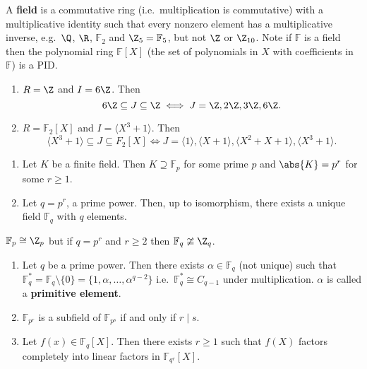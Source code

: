 \documentclass{article}
\newcommand{\F}{\mathbb{F}}
\newcommand{\1}[1]{\mathbbm{1}_{#1}}
\begin{document}
A \textbf{field} is a commutative ring (i.e.\ multiplication is commutative) with a multiplicative identity such that every nonzero element has a multiplicative inverse, e.g.\ $\Q$, $\R$, $\F_2$ and $\Z_5 = \F_5$, but not $\Z$ or $\Z_{10}$.
Note if $\F$ is a field then the polynomial ring $\F[X]$ (the set of polynomials in $X$ with coefficients in $\F$) is a PID.
\begin{eg}\leavevmode
    \begin{enumerate}[label=(\roman*)]
        \item $R = \Z$ and $I = 6\Z$. Then
            \begin{equation*}
                6\Z \subseteq J \subseteq \Z \iff J = \Z, 2\Z, 3\Z, 6\Z.
            \end{equation*}
        \item $R = \F_2[X]$ and $I = \langle X^3 + 1 \rangle$. Then
            \begin{equation*}
                \langle X^3 + 1 \rangle \subseteq J \subseteq F_2[X] \iff J = \langle 1 \rangle, \langle X+1 \rangle, \langle X^2 + X + 1 \rangle , \langle X^3 + 1 \rangle.
            \end{equation*}
    \end{enumerate}
\end{eg}
\begin{thm} \leavevmode
    \begin{enumerate}[label=(\roman*)]
        \item Let $K$ be a finite field. Then $K \supseteq \F_p$ for some prime $p$ and $\abs{K} = p^r$ for some $r \geq 1$.
        \item Let $q = p^r$, a prime power. Then, up to isomorphism, there exists a unique field $\F_q$ with $q$ elements.
    \end{enumerate}
\end{thm}
\begin{warning}
    $\F_p \cong \Z_p$ but if $q = p^r$ and $r \geq 2$ then $\F_q \ncong \Z_q$.
\end{warning}
\begin{prop}
    \begin{enumerate}[label=(\roman*)]
        \item Let $q$ be a prime power. Then there exists $\alpha \in \F_q$ (not unique) such that $\F_q^* = \F_q \setminus \{0\} = \{1, \alpha, \dotsc, \alpha^{q-2}\}$ i.e.\ $\F_q^* \cong C_{q-1}$ under multiplication.
            $\alpha$ is called a \textbf{primitive element}.
        \item $\F_{p^r}$ is a subfield of $\F_{p^s}$ if and only if $r \mid s$.
        \item Let $f(x) \in \F_q[X]$. Then there exists $r \geq 1$ such that $f(X)$ factors completely into linear factors in $\F_{q^r}[X]$.
    \end{enumerate}
\end{prop}
\end{document}
